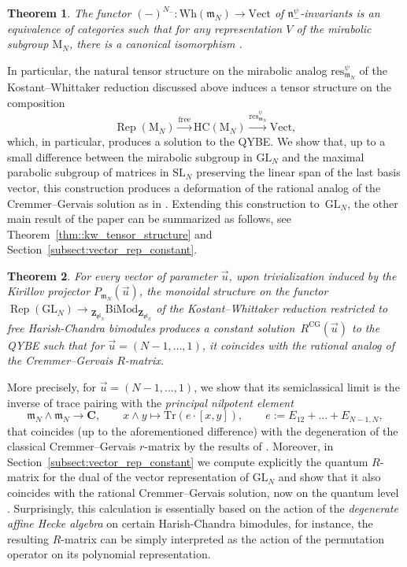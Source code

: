 \documentclass[10pt,a4paper]{amsart}
\numberwithin{equation}{section}
\newtheorem{thmx}{Theorem}
\newcommand{\CG}{\mathrm{CG}}
\newcommand{\Tr}{\mathrm{Tr}}
\newcommand{\C}{\mathbf{C}}
\newcommand{\Z}{\mathbf{Z}}
\newcommand{\GL}{\mathrm{GL}}
\newcommand{\n}{\mathfrak{n}}
\newcommand{\m}{\mathfrak{m}}
\newcommand{\BiMod}[2]{{}_{#1}\mathrm{BiMod}_{#2}}
\newcommand{\free}{\mathrm{free}}
\DeclareMathOperator{\Rep}{Rep}
\newcommand{\res}{\mathrm{res}}
\newcommand{\Vect}{\mathrm{Vect}}
\newcommand{\gl}{\mathfrak{gl}}
\begin{document}
	\begin{thmx}
		The functor $(-)^{N_-} \colon \mathrm{Wh}(\m_N) \rightarrow \Vect$ of $\n_-^{\psi}$-invariants is an equivalence of categories such that for any representation $V$ of the mirabolic subgroup $\mathrm{M}_N$, there is a canonical isomorphism
	\smash{$
		\bigl(\n_-^{\psi} \backslash V \otimes \mathrm{U}(\m_N)\bigr)^{N_-} \cong V$}.
	\end{thmx}
	
	In particular, the natural tensor structure on the mirabolic analog $\res_{\m_N}^{\psi}$ of the Kostant--Whittaker reduction discussed above induces a tensor structure on the composition
	\[
	\Rep(\mathrm{M}_N) \xrightarrow{\free} \mathrm{HC}(\mathrm{M}_N) \xrightarrow{\res_{\m_N}^{\psi}} \Vect,
	\]
	which, in particular, produces a solution to the QYBE. We show that, up to a small difference between the mirabolic subgroup in $\GL_N$ and the maximal parabolic subgroup of matrices in $\mathrm{SL}_N$ preserving the linear span of the last basis vector, this construction produces a deformation of the rational analog of the Cremmer--Gervais solution as in \cite{EndelmanHodges}. Extending this construction to~$\GL_N$, the other main result of the paper can be summarized as follows, see Theorem~\ref{thm::kw_tensor_structure} and Section~\ref{subsect:vector_rep_constant}.
	
	\begin{thmx}
		For every vector of parameter $\vec{u}$, upon trivialization induced by the Kirillov projector $P_{\m_N}(\vec{u})$, the monoidal structure on the functor $\Rep(\GL_N) \rightarrow \BiMod{\Z_{\gl_N}}{\Z_{\gl_N}}$ of the Kostant--Whittaker reduction restricted to free Harish-Chandra bimodules produces a constant solution~$R^{\CG}(\vec{u})$ to the QYBE such that for $\vec{u} = (N-1,\dots,1)$, it coincides with the rational analog of the Cremmer--Gervais $R$-matrix.
	\end{thmx}
	
	More precisely, for $\vec{u} = (N-1,\dots,1)$, we show that its semiclassical limit is the inverse of trace pairing with the \emph{principal nilpotent element}
	\[
	\m_N \wedge \m_N \rightarrow \C, \qquad x \wedge y \mapsto \Tr(e\cdot[x,y]), \qquad e := E_{12} + \dots + E_{N-1,N},
	\]
	that coincides (up to the aforementioned difference) with the degeneration of the classical Cremmer--Gervais $r$-matrix by the results of \cite{GerstenhaberGiaquinto}. Moreover, in Section~\ref{subsect:vector_rep_constant} we compute explicitly the quantum $R$-matrix for the dual of the vector representation of $\GL_N$ and show that it also coincides with the rational Cremmer--Gervais solution, now on the quantum level \cite{EndelmanHodges}. Surprisingly, this calculation is essentially based on the action of the \emph{degenerate affine Hecke algebra} on certain Harish-Chandra bimodules, for instance, the resulting $R$-matrix can be simply interpreted as the action of the permutation operator on its polynomial representation.
	
\end{document}
